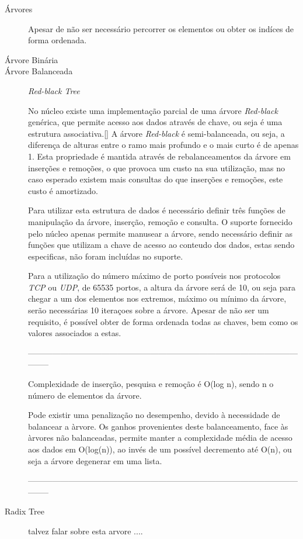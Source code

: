 \begin{description}
\item[Árvores]
Apesar de não ser necessário percorrer os elementos ou obter os indíces de forma ordenada. 


\item[Árvore Binária]

\item[Árvore Balanceada]
\textit{Red-black Tree} 


No núcleo existe uma implementação parcial de uma árvore \textit{Red-black} genérica, que permite acesso aos dados através de chave, ou seja é uma estrutura associativa.\ref{}
A árvore \textit{Red-black} é semi-balanceada, ou seja, a diferença de alturas entre o ramo mais profundo e o mais curto é de apenas 1.
Esta propriedade é mantida através de rebalanceamentos da árvore em inserções e remoções, o que provoca um custo na sua utilização, mas no caso esperado existem mais consultas do que inserções e remoções, este custo é amortizado.

Para utilizar esta estrutura de dados é necessário definir três funções de manipulação da árvore, inserção, remoção e consulta.
O suporte fornecido pelo núcleo apenas permite manusear a árvore, sendo necessário definir as funções que utilizam a chave de acesso ao conteudo dos dados, estas sendo especificas, não foram incluídas no suporte.

Para a utilização do número máximo de porto possíveis nos protocolos \textit{TCP} ou \textit{UDP}, de 65535 portos, a altura da árvore será de 10, ou seja para chegar a um dos elementos nos extremos, máximo ou mínimo da árvore, serão necessárias 10 iteraçoes sobre a árvore.
Apesar de não ser um requisito, é possível obter de forma ordenada todas as chaves, bem como os valores associados a estas.

-----------------------------------------------------------------------------------------------------------

Complexidade de inserção, pesquisa e remoção é O(log n), sendo n o número de elementos da árvore.

Pode existir uma penalização no desempenho, devido à necessidade de balancear a àrvore.
Os ganhos provenientes deste balanceamento, face às àrvores não balanceadas, permite manter a complexidade média de acesso aos dados em O(log(n)), ao invés de um possível decremento até O(n), ou seja a árvore degenerar em uma lista.

-----------------------------------------------------------------------------------------------------------
\item[Radix Tree]
talvez falar sobre esta arvore ....

\end{description}

